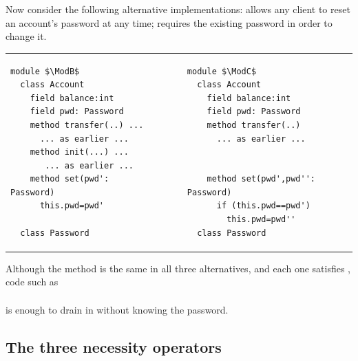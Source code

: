  
Now consider the following alternative implementations:
\ModB allows any client to reset an account's password at any time;
\ModC requires the existing password in order to change it.
  
  

\begin{tabular}{lll}
\begin{minipage}[b]{0.42\textwidth}
\begin{lstlisting}[mathescape=true, language=chainmail, frame=lines]
module $\ModB$
  class Account
    field balance:int 
    field pwd: Password 
    method transfer(..) ...
      ... as earlier ...
    method init(...) ...
       ... as earlier ...
    method set(pwd': Password)
      this.pwd=pwd'
      
  class Password
\end{lstlisting}
\end{minipage}
&\ \ \  \ \   &%
\begin{minipage}[b]{0.45\textwidth}
\begin{lstlisting}[mathescape=true, language=chainmail, frame=lines]
module $\ModC$
  class Account
    field balance:int 
    field pwd: Password 
    method transfer(..) 
      ... as earlier ...
    
    
    method set(pwd',pwd'': Password)
      if (this.pwd==pwd') 
        this.pwd=pwd''
  class Password
\end{lstlisting}
\end{minipage} 
\end{tabular}

Although the  method is the same in
all three alternatives, and each one satisfies \Sclassic,
code  {such as}
\\ 
$\ \strut \hspace{.2in} $ 
\\ 
is enough to drain   in \ModB without knowing the password.

\subsection{The three necessity operators}
\label{s:approach:necopers}

